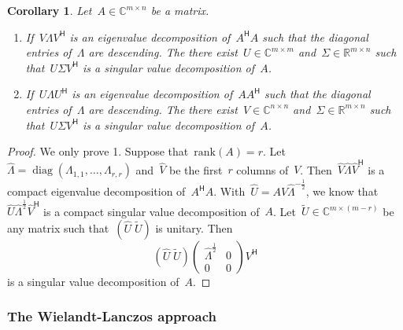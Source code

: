 \documentclass[11pt,a4paper]{article}  %
\numberwithin{equation}{section}
\newtheorem{corollary}{Corollary}%
\theoremstyle{definition}
\def\RR{\mathbb{R}}
\def\CC{\mathbb{C}}
\newcommand{\hmt}{{\scriptscriptstyle{{\mathsf{H}}}}}
\newcommand{\rank}{\mathrm{rank}}
\newcommand{\diag}{\operatorname*{diag}}
\begin{document}
\begin{corollary}
  \label{coro:eyfull}
  Let~$A \in \CC^{m\times n}$ be a matrix.
  \begin{enumerate}[leftmargin=1.5em]
    \item If~$V\Lambda V^\hmt$ is an eigenvalue decomposition of~$A^\hmt A$ such
      that the diagonal entries of~$\Lambda$ are descending. The there exist~$U\in \CC^{m\times m}$
      and~$\Sigma \in \RR^{m\times n}$ such that~$U\Sigma V^\hmt$ is a singular value decomposition of~$A$.
    \item If~$U\Lambda U^\hmt$ is an eigenvalue decomposition of~$AA^\hmt$ such
      that the diagonal entries of~$\Lambda$ are descending. The there exist~$V\in \CC^{n\times n}$
      and~$\Sigma \in \RR^{m\times n}$ such that~$U\Sigma V^\hmt$ is a singular value decomposition of~$A$.
  \end{enumerate}
\end{corollary}

\begin{proof}
  We only prove 1. Suppose that~$\rank(A) = r$. Let~$\hat{\Lambda} = \diag(\Lambda_{1,1}, \dots,
  \Lambda_{r,r})$ and~$\hat{V}$ be the first~$r$ columns of~$V$. Then~$\hat{V} \hat{\Lambda}
  \hat{V}^\hmt$ is a compact eigenvalue decomposition of~$A^\hmt A$. With~$\hat{U}
  = A\hat{V}\hat{\Lambda}^{-\frac{1}{2}}$, we know that~$\hat{U}\hat{\Lambda}^{\frac{1}{2}}\hat{V}^\hmt$ is
  a compact singular value decomposition of~$A$.
  Let~$\tilde{U}\in \CC^{m\times(m-r)}$ be any matrix such that~$(\hat{U}\; \tilde{U})$ is
  unitary. Then
  \begin{equation*}
    (\hat{U}\; \tilde{U})
    \begin{pmatrix}
      \hat{\Lambda}^{\frac{1}{2}} & 0\\
      0 & 0
    \end{pmatrix}
    V^\hmt
  \end{equation*}
  is a singular value decomposition of~$A$.
\end{proof}

\subsubsection{The Wielandt-Lanczos approach~\cite{Lanczos_1958}}
\end{document}
